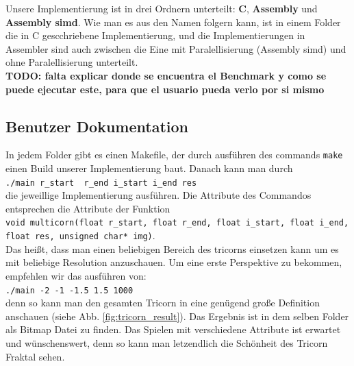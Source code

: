 \documentclass[course=erap]{aspdoc}
\begin{document}
Unsere Implementierung ist in drei Ordnern unterteilt: \textbf{C}, \textbf{Assembly} und \textbf{Assembly simd}. Wie man es aus den Namen folgern kann, ist in einem Folder die in C gescchriebene Implementierung, und die Implementierungen in Assembler sind auch zwischen die Eine mit Paralellisierung (Assembly simd) und ohne Paralellisierung unterteilt. \\

\textbf{TODO: falta explicar donde se encuentra el Benchmark y como se puede ejecutar este, para que el usuario pueda verlo por si mismo}

\subsection{Benutzer Dokumentation}\label{sub:benutzer}

In jedem Folder gibt es einen Makefile, der durch ausf\"uhren des commands \lstinline{make} einen Build unserer Implementierung baut. Danach kann man durch \\

\lstinline{./main r_start  r_end i_start i_end res} \\

die jeweillige Implementierung ausf\"uhren. Die Attribute des Commandos entsprechen die Attribute der Funktion \\

\lstinline{void multicorn(float r_start, float r_end, float i_start, float i_end, float res, unsigned char* img)}. \\

Das hei{\ss}t, dass man einen beliebigen Bereich des tricorns einsetzen kann um es mit beliebige Resolution anzuschauen. Um eine erste Perspektive zu bekommen, empfehlen wir das ausf\"uhren von: \\

\lstinline{./main -2 -1 -1.5 1.5 1000}\\

denn so kann man den gesamten Tricorn in eine gen\"ugend gro{\ss}e Definition anschauen (siehe Abb. \ref{fig:tricorn_result}). Das Ergebnis ist in dem selben Folder als Bitmap Datei zu finden. Das Spielen mit verschiedene Attribute ist erwartet und w\"unschenswert, denn so kann man letzendlich die Sch\"onheit des Tricorn Fraktal sehen. \\
\end{document}
